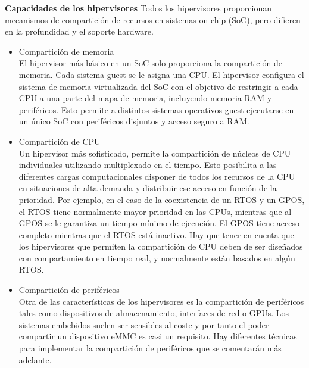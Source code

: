 \textbf{Capacidades de los hipervisores}
Todos los hipervisores proporcionan mecanismos de compartición de recursos en sistemas on chip (SoC), pero difieren en la profundidad y el soporte hardware.
\begin{itemize}
	\item Compartición de memoria\\
	El hipervisor más básico en un \acrshort{SoC} solo proporciona la compartición de memoria. Cada sistema guest se le asigna una CPU. El hipervisor configura el sistema de memoria virtualizada del SoC con el objetivo de restringir a cada CPU a una parte del mapa de memoria, incluyendo memoria RAM y periféricos. Esto permite a distintos sistemas operativos guest ejecutarse en un único SoC con periféricos disjuntos y acceso seguro a \acrshort{RAM}.
	\item Compartición de CPU\\
	Un hipervisor más sofisticado, permite la compartición de núcleos de CPU individuales utilizando multiplexado en el tiempo. Esto posibilita a las diferentes cargas computacionales disponer de todos los recursos de la CPU en situaciones de alta demanda y distribuir ese acceso en función de la prioridad. Por ejemplo, en el caso de la coexistencia de un \acrshort{RTOS} y un \acrshort{GPOS}, el \acrshort{RTOS} tiene normalmente mayor prioridad en las CPUs, mientras que al \acrshort{GPOS} se le garantiza un tiempo mínimo de ejecución. El \acrshort{GPOS} tiene acceso completo mientras que el \acrshort{RTOS} está inactivo. Hay que tener en cuenta que los hipervisores que permiten la compartición de CPU deben de ser diseñados con compartamiento en tiempo real, y normalmente están basados en algún \acrshort{RTOS}.
	\item Compartición de periféricos\\
	Otra de las características de los hipervisores es la compartición de periféricos tales como dispositivos de almacenamiento, interfaces de red o \acrshort{GPU}s. Los sistemas embebidos suelen ser sensibles al coste y por tanto el poder compartir un dispositivo \acrshort{eMMC} es casi un requisito. Hay diferentes técnicas para implementar la compartición de periféricos que se comentarán más adelante.
\end{itemize}

